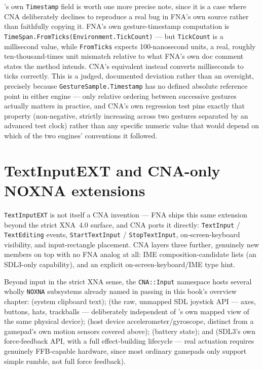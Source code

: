 's own \texttt{Timestamp} field is worth one more precise note, since
it is a case where CNA deliberately declines to reproduce a real bug in FNA's own source rather
than faithfully copying it. FNA's own gesture-timestamp computation is
\texttt{TimeSpan.FromTicks(Environment.TickCount)} --- but \texttt{TickCount} is a millisecond
value, while \texttt{FromTicks} expects 100-nanosecond units, a real, roughly ten-thousand-times
unit mismatch relative to what FNA's own doc comment states the method intends. CNA's
equivalent instead converts milliseconds to ticks correctly. This is a judged, documented
deviation rather than an oversight, precisely because \texttt{GestureSample.Timestamp} has no
defined absolute reference point in either engine --- only relative ordering between
successive gestures actually matters in practice, and CNA's own regression test pins exactly
that property (non-negative, strictly increasing across two gestures separated by an advanced
test clock) rather than any specific numeric value that would depend on which of the two
engines' conventions it followed.

\section{TextInputEXT and CNA-only NOXNA extensions}

\texttt{TextInputEXT} is not itself a CNA invention --- FNA ships this same extension beyond
the strict XNA~4.0 surface, and CNA ports it directly: \texttt{TextInput} / \texttt{TextEditing}
events, \texttt{StartTextInput} / \texttt{StopTextInput}, on-screen-keyboard visibility, and
input-rectangle placement. CNA layers three further, genuinely new members on top with no FNA
analog at all: IME composition-candidate lists (an SDL3-only capability), and an explicit
on-screen-keyboard/IME type hint.

Beyond input in the strict XNA sense, the \texttt{CNA::Input} namespace hosts several wholly
\texttt{NOXNA} subsystems already named in passing in this book's overview chapter:
 (system clipboard text);  (the raw, unmapped SDL
joystick API --- axes, buttons, hats, trackballs --- deliberately independent of
's own mapped view of the same physical device);  (host
device accelerometer/gyroscope, distinct from a gamepad's own motion sensors covered above);
 (battery state); and  (SDL3's own force-feedback API, with
a full effect-building lifecycle --- real actuation requires genuinely FFB-capable hardware,
since most ordinary gamepads only support simple rumble, not full force feedback).

